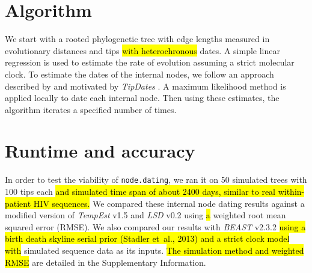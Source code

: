 \documentclass{bioinfo}
\newcommand{\code}[1]{{\tt #1}}
\newcommand{\edit}[1]{\hl{#1}}
\begin{document}
\vspace*{-18pt}

\section{Algorithm} \label{sec:alg}
We start with a rooted phylogenetic tree with edge lengths measured in evolutionary distances and tips \edit{with heterochronous} dates.
A simple linear regression is used to estimate the rate of evolution assuming a strict molecular clock.
To estimate the dates of the internal nodes, we follow an approach described by \cite{Felsenstein81} and motivated by \emph{TipDates} \citep{TipDates}.
A maximum likelihood method is applied locally to date each internal node.
Then using these estimates, the algorithm iterates a specified number of times.

\vspace*{-18pt}

\section{Runtime and accuracy} \label{sec:tests}
In order to test the viability of \code{node.dating}, we ran it on 50 simulated trees with 100 tips each \edit{and simulated time span of about 2400 days, similar to real within-patient HIV sequences.}
We compared these internal node dating results against a modified version of \emph{TempEst} v1.5 and \emph{LSD} v0.2 using \edit{a} weighted root mean squared error (RMSE).
We also compared our results with \emph{BEAST} v2.3.2 \edit{using a birth death skyline serial prior (Stadler et~al., 2013) and a strict clock model with} simulated sequence data as its inputs.
\edit{The simulation method and weighted RMSE} are detailed in the Supplementary Information.
\end{document}

